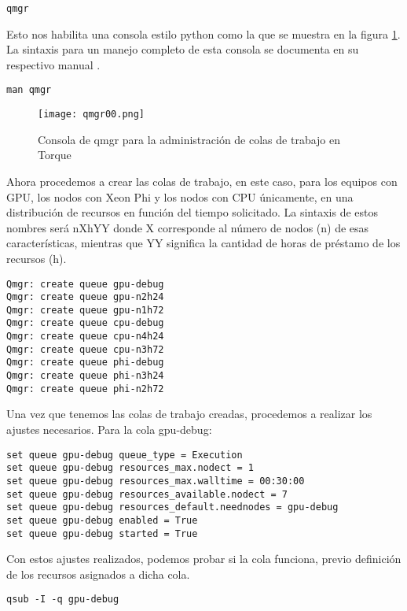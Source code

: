 \begin{lstlisting}
qmgr
\end{lstlisting}

Esto nos habilita una consola estilo python como la que se muestra en la figura \ref{fig:qmgr:00}. La sintaxis para un manejo completo de esta consola se documenta en su respectivo manual \cite{qmgr}.

\begin{lstlisting}
man qmgr
\end{lstlisting}

\begin{figure}[H]
\centering
\texttt{[image: qmgr00.png]}
\caption{Consola de qmgr para la administración de colas de trabajo en Torque}
\label{fig:qmgr:00}
\end{figure}

Ahora procedemos a crear las colas de trabajo, en este caso, para los equipos con GPU, los nodos con Xeon Phi y los nodos con CPU únicamente, en una distribución de recursos en función del tiempo solicitado. La sintaxis de estos nombres será nXhYY donde X corresponde al número de nodos (n) de esas características, mientras que YY significa la cantidad de horas de préstamo de los recursos (h).

\begin{lstlisting}
Qmgr: create queue gpu-debug
Qmgr: create queue gpu-n2h24
Qmgr: create queue gpu-n1h72
Qmgr: create queue cpu-debug
Qmgr: create queue cpu-n4h24
Qmgr: create queue cpu-n3h72
Qmgr: create queue phi-debug
Qmgr: create queue phi-n3h24
Qmgr: create queue phi-n2h72
\end{lstlisting}

Una vez que tenemos las colas de trabajo creadas, procedemos a realizar los ajustes necesarios. Para la cola gpu-debug:

\begin{lstlisting}
set queue gpu-debug queue_type = Execution
set queue gpu-debug resources_max.nodect = 1
set queue gpu-debug resources_max.walltime = 00:30:00
set queue gpu-debug resources_available.nodect = 7
set queue gpu-debug resources_default.neednodes = gpu-debug
set queue gpu-debug enabled = True
set queue gpu-debug started = True
\end{lstlisting}

Con estos ajustes realizados, podemos probar si la cola funciona, previo definición de los recursos asignados a dicha cola.

\begin{lstlisting}
qsub -I -q gpu-debug
\end{lstlisting}

